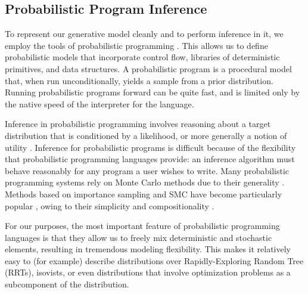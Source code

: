 \documentclass[twoside]{article}
\begin{document}
\vspace{-0.33em}
\subsection{Probabilistic Program Inference}
\vspace{-0.33em}

To represent our generative model cleanly and to perform inference in it, we employ the tools of probabilistic programming \cite{vandemeent2018introduction}. This allows us to define probabilistic models that incorporate control flow, libraries of deterministic primitives, and data structures. %
A probabilistic program is a procedural model that, when run unconditionally, yields a sample from a prior distribution. Running probabilistic programs forward can be quite fast, and is limited only by the native speed of the interpreter for the language.

Inference in probabilistic programming involves reasoning about a target distribution that is conditioned by a likelihood, or more generally a notion of utility \cite{vandemeent2018introduction}.
Inference for probabilistic programs is difficult because of the flexibility that probabilistic programming languages provide: an inference algorithm must behave reasonably for any program a user wishes to write. Many probabilistic programming systems rely on Monte Carlo methods due to their generality \cite{goodman08,milch05,pfeffer01,standevelopmentteam2014stan,venture}. Methods based on importance sampling and SMC have become particularly popular \cite{murray2013,todeschini2014biips,wood-aistats-2014,goodman2014dippl,ge2016turing}, owing to their simplicity and compositionality \cite{naesseth2015nested}.

For our purposes, the most important feature of probabilistic programming languages is that they allow us to freely mix deterministic and stochastic elements, resulting in tremendous modeling flexibility.  This makes it relatively easy to (for example) describe distributions over Rapidly-Exploring Random Tree (RRTs), isovists, or even distributions that involve optimization problems as a subcomponent of the distribution.

\end{document}
